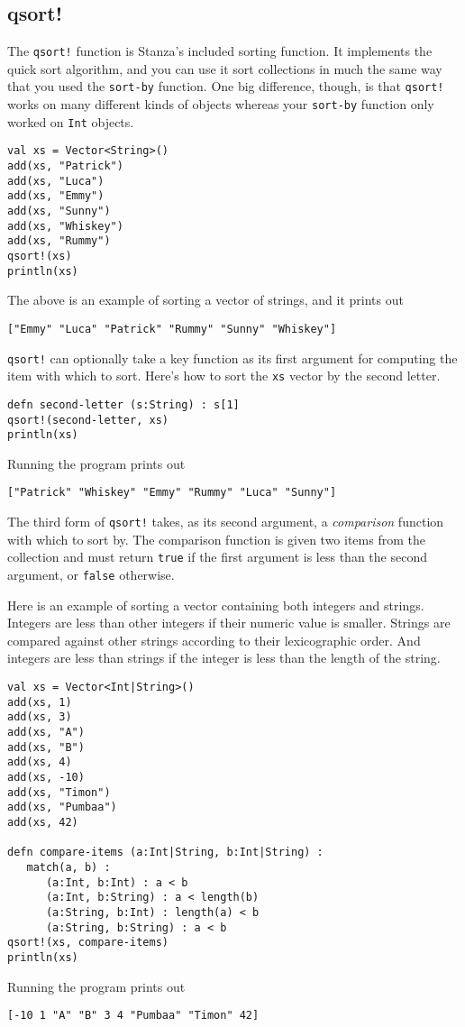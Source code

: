 \documentclass[10pt,oneside]{book}
\begin{document}
\subsection*{qsort!}
The \texttt{\frenchspacing qsort!} function is Stanza's included sorting function. It implements the quick sort algorithm, and you can use it sort collections in much the same way that you used the \texttt{\frenchspacing sort-by} function. One big difference, though, is that \texttt{\frenchspacing qsort!} works on many different kinds of objects whereas your \texttt{\frenchspacing sort-by} function only worked on \texttt{\frenchspacing Int} objects. 
\begin{lstlisting}
val xs = Vector<String>()
add(xs, "Patrick")
add(xs, "Luca")
add(xs, "Emmy")
add(xs, "Sunny")
add(xs, "Whiskey")
add(xs, "Rummy")
qsort!(xs)
println(xs)
\end{lstlisting}
The above is an example of sorting a vector of strings, and it prints out
\begin{lstlisting}
["Emmy" "Luca" "Patrick" "Rummy" "Sunny" "Whiskey"]
\end{lstlisting}

\texttt{\frenchspacing qsort!} can optionally take a key function as its first argument for computing the item with which to sort. Here's how to sort the \texttt{\frenchspacing xs} vector by the second letter.
\begin{lstlisting}
defn second-letter (s:String) : s[1]
qsort!(second-letter, xs)
println(xs)
\end{lstlisting}
Running the program prints out
\begin{lstlisting}
["Patrick" "Whiskey" "Emmy" "Rummy" "Luca" "Sunny"]
\end{lstlisting}

The third form of \texttt{\frenchspacing qsort!} takes, as its second argument, a {\em comparison} function with which to sort by. The comparison function is given two items from the collection and must return \texttt{\frenchspacing true} if the first argument is less than the second argument, or \texttt{\frenchspacing false} otherwise. 

Here is an example of sorting a vector containing both integers and strings. Integers are less than other integers if their numeric value is smaller. Strings are compared against other strings according to their lexicographic order. And integers are less than strings if the integer is less than the length of the string.
\begin{lstlisting}
val xs = Vector<Int|String>()
add(xs, 1)
add(xs, 3)
add(xs, "A")
add(xs, "B")
add(xs, 4)
add(xs, -10)
add(xs, "Timon")
add(xs, "Pumbaa")
add(xs, 42)

defn compare-items (a:Int|String, b:Int|String) :
   match(a, b) :
      (a:Int, b:Int) : a < b
      (a:Int, b:String) : a < length(b)
      (a:String, b:Int) : length(a) < b
      (a:String, b:String) : a < b
qsort!(xs, compare-items)
println(xs)
\end{lstlisting}
Running the program prints out
\begin{lstlisting}
[-10 1 "A" "B" 3 4 "Pumbaa" "Timon" 42]
\end{lstlisting}
\end{document}

